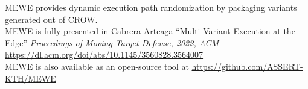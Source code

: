 



\begin{tcolorbox}[title=Contribution paper and artifact,boxrule=1pt,arc=.2em,boxsep=1.0mm]
  MEWE provides dynamic execution path randomization by packaging variants generated out of CROW.\\
  MEWE is fully presented in Cabrera-Arteaga \etal ``Multi-Variant Execution at the Edge''
  \emph{Proceedings of Moving Target Defense, 2022, ACM}
 \url{https://dl.acm.org/doi/abs/10.1145/3560828.3564007}
 \\
 MEWE is also available as an open-source tool at \url{https://github.com/ASSERT-KTH/MEWE}
\end{tcolorbox}